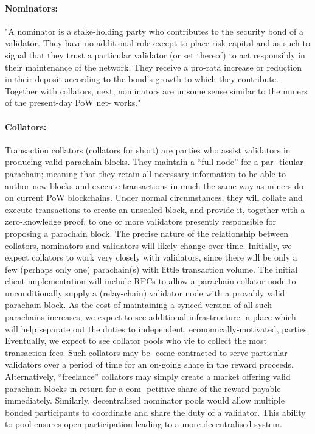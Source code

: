 \paragraph{Nominators:} \label{par:nominators} "A nominator is a stake-holding party who contributes to the security bond of a validator. They have no additional role except to place risk capital and as such to signal that they trust a particular validator (or set thereof) to act responsibly in their maintenance of the network. They receive a pro-rata increase or reduction in their deposit according to the bond’s growth to which they contribute.
Together with collators, next, nominators are in some sense similar to the miners of the present-day PoW net- works."

\paragraph{Collators: } \label{par:collators} Transaction collators (collators for short) are parties who assist validators in producing valid parachain blocks. They maintain a “full-node” for a par- ticular parachain; meaning that they retain all necessary information to be able to author new blocks and execute transactions in much the same way as miners do on current PoW blockchains. Under normal circumstances, they will collate and execute transactions to create an unsealed block, and provide it, together with a zero-knowledge proof, to one or more validators presently responsible for proposing a parachain block.
The precise nature of the relationship between collators, nominators and validators will likely change over time. Initially, we expect collators to work very closely with validators, since there will be only a few (perhaps only one) parachain(s) with little transaction volume. The initial client implementation will include RPCs to allow a parachain collator node to unconditionally supply a (relay-chain) validator node with a provably valid parachain block. As the cost of maintaining a synced version of all such parachains increases, we expect to see additional infrastructure in place which will help separate out the duties to independent, economically-motivated, parties.
Eventually, we expect to see collator pools who vie to collect the most transaction fees. Such collators may be- come contracted to serve particular validators over a period of time for an on-going share in the reward proceeds. Alternatively, “freelance” collators may simply create a market offering valid parachain blocks in return for a com- petitive share of the reward payable immediately. Similarly, decentralised nominator pools would allow multiple bonded participants to coordinate and share the duty of a validator. This ability to pool ensures open participation leading to a more decentralised system.

